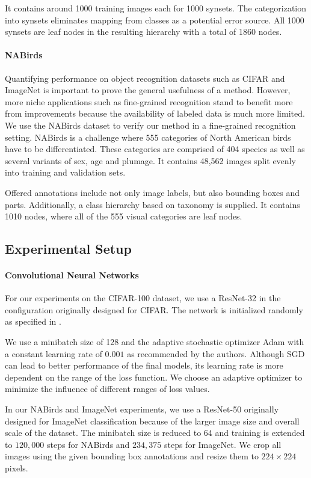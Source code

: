 \documentclass[10pt,twocolumn,letterpaper]{article}
\begin{document}
It contains around 1000 training images each for
1000 synsets. The categorization into synsets eliminates mapping from classes as a potential error source.
All 1000 synsets are leaf nodes in the resulting hierarchy with a total of 1860 nodes.

\paragraph{NABirds}
Quantifying performance on object recognition datasets such as CIFAR and
ImageNet is important to prove the general usefulness of a method. However, more niche applications
such as fine-grained recognition stand to benefit more from improvements because the availability
of labeled data is much more limited.
We use the NABirds dataset \cite{VanHorn2015NAB} to verify our method in a fine-grained recognition
setting. NABirds is a challenge where 555 categories of North American birds have to be differentiated.
These categories are comprised of 404 species as well as several variants of sex, age and plumage.
It contains 48,562 images split evenly into training and validation sets.

Offered annotations include not only image labels, but also bounding boxes and parts.
Additionally, a class hierarchy based on taxonomy is supplied. 
It contains 1010 nodes, where all of the 555 visual categories are leaf nodes.

\subsection{Experimental Setup}
\paragraph{Convolutional Neural Networks}
\label{sec:expsetup}
For our experiments on the CIFAR-100 dataset, we use a ResNet-32 \cite{He2015Res}
in the configuration originally designed for CIFAR. The network is initialized randomly as specified
in \cite{He2015Res}.

We use a minibatch size of 128 and the adaptive stochastic optimizer Adam \cite{Kingma2014Adam} with a
constant learning rate of $0.001$ as recommended by the authors. Although SGD can lead to better
performance of the final models, its learning rate is more dependent on the range of the loss function.
We choose an adaptive optimizer to minimize the influence of different ranges of loss values.

In our NABirds and ImageNet experiments, we use a ResNet-50 \cite{He2015Res,He2016Identity}
originally designed for ImageNet classification because of the larger image size and overall scale of the dataset.
The minibatch size is reduced to 64 and training is extended to $120,000$ steps for NABirds and $234,375$ steps for ImageNet.
We crop all images using the given bounding box annotations and resize them to $224\times 224$ pixels.
\end{document}

